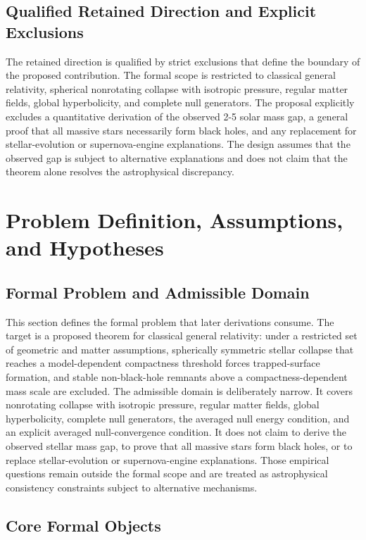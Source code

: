 \documentclass[conference]{IEEEtran}
\begin{document}
\subsection{Qualified Retained Direction and Explicit Exclusions}
The retained direction is qualified by strict exclusions that define the boundary of the proposed contribution. The formal scope is restricted to classical general relativity, spherical nonrotating collapse with isotropic pressure, regular matter fields, global hyperbolicity, and complete null generators. The proposal explicitly excludes a quantitative derivation of the observed 2-5 solar mass gap, a general proof that all massive stars necessarily form black holes, and any replacement for stellar-evolution or supernova-engine explanations. The design assumes that the observed gap is subject to alternative explanations and does not claim that the theorem alone resolves the astrophysical discrepancy.

\section{Problem Definition, Assumptions, and Hypotheses}
\subsection{Formal Problem and Admissible Domain}
This section defines the formal problem that later derivations consume. The target is a proposed theorem for classical general relativity: under a restricted set of geometric and matter assumptions, spherically symmetric stellar collapse that reaches a model-dependent compactness threshold forces trapped-surface formation, and stable non-black-hole remnants above a compactness-dependent mass scale are excluded. The admissible domain is deliberately narrow. It covers nonrotating collapse with isotropic pressure, regular matter fields, global hyperbolicity, complete null generators, the averaged null energy condition, and an explicit averaged null-convergence condition. It does not claim to derive the observed stellar mass gap, to prove that all massive stars form black holes, or to replace stellar-evolution or supernova-engine explanations. Those empirical questions remain outside the formal scope and are treated as astrophysical consistency constraints subject to alternative mechanisms.

\subsection{Core Formal Objects}
\end{document}

